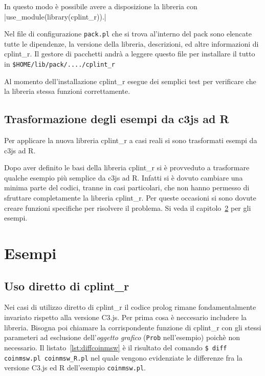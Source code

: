 \documentclass[10pt,titlepage,twoside,a4paper]{report}
\begin{document}
In questo modo è possibile avere a disposizione la libreria con 
|use_module(library(cplint_r)).|

Nel file di configurazione \texttt{pack.pl} che si trova al'interno del pack 
sono elencate tutte le dipendenze, la versione della libreria, descrizioni, 
ed altre informazioni di cplint\_r. Il gestore di pacchetti andrà a leggere 
questo file per installare il tutto in \texttt{\$HOME/lib/pack/..../cplint\_r}

Al momento dell'installazione cplint\_r esegue dei semplici 
test per verificare che la libreria stessa funzioni correttamente.


\section{Trasformazione degli esempi da c3js ad R} \label{sec:trasformazione-
degli-esempi-da-c3js-ad-r}
Per applicare la nuova libreria cplint\_r a casi reali si sono trasformati 
esempi da c3js ad R.

Dopo aver definito le basi della libreria cplint\_r si è provveduto a 
trasformare qualche esempio più semplice da c3js ad R. Infatti si è 
dovuto cambiare una minima parte del codici, tranne in casi particolari, che 
non hanno permesso di sfruttare completamente la 
libreria cplint\_r. Per queste occasioni si sono dovute creare funzioni 
specifiche per risolvere il problema. Si veda il capitolo~\ref{ch:esempi} per 
gli esempi.




\chapter{Esempi}
\label{ch:esempi}

\section{Uso diretto di cplint\_r}
Nei casi di utilizzo diretto di cplint\_r il codice prolog rimane 
fondamentalmente invariato rispetto alla  versione C3.js. Per prima cosa è 
neccesario includere la libreria. Bisogna poi chiamare la corrispondente 
funzione di cplint\_r con gli stessi parameteri ad esclusione 
dell'\emph{oggetto grafico} (\texttt{Prob} nell'esempio) poichè non 
necessario. Il listato~\ref{lst:diffcoinmsw} è il risultato del comando
\texttt{\$ diff coinmsw.pl coinmsw\_R.pl}
nel quale vengono evidenziate le differenze fra la versione C3.js 
\cite{coinmswpl} ed R \cite{coinmswrpl} dell'esempio \texttt{coinmsw.pl}.
\end{document}
